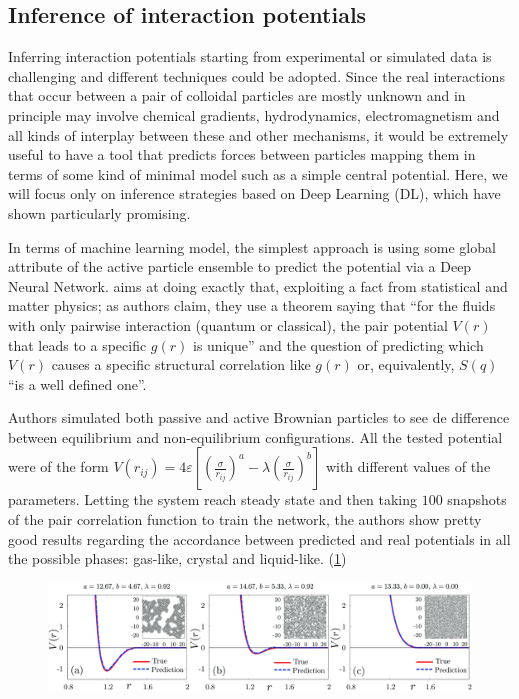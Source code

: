 \documentclass[../../master_thesis_np.tex]{subfiles}
\begin{document}
	\subsection{Inference of interaction potentials}
	Inferring interaction potentials starting from experimental or simulated data is challenging and different techniques could be adopted. 
	Since the real interactions that occur between a pair of colloidal particles are mostly unknown and in principle may involve chemical gradients, hydrodynamics, electromagnetism and all kinds of interplay between these and other mechanisms, it would be extremely useful to have a tool that predicts forces between particles mapping them in terms of some kind of minimal model such as a simple central potential. 
	Here, we will focus only on inference strategies based on Deep Learning (DL), which have shown particularly promising. 
	
	In terms of machine learning model, the simplest approach is using some global attribute of the active particle ensemble to predict the potential via a Deep Neural Network. 
	\cite{bag_interaction_2021} aims at doing exactly that, exploiting a fact from statistical and matter physics; as authors claim, they use a theorem saying that \enquote{for the fluids with only pairwise interaction (quantum or classical), the pair potential $V(r)$ that leads to a specific $g(r)$ is unique} and the question of predicting which $V(r)$ causes a specific structural correlation like $g(r)$ or, equivalently, $S(q)$ \enquote{is a well defined one}. 
	
	Authors simulated both passive and active Brownian particles to see de difference between equilibrium and non-equilibrium configurations. 
	All the tested potential were of the form $V(r_{ij}) = 4\varepsilon \left[ \left( \frac{\sigma}{r_{ij}} \right)^a - \lambda \left( \frac{\sigma}{r_{ij}} \right)^b \right]$ with different values of the parameters. 
	Letting the system reach steady state and then taking $100$ snapshots of the pair correlation function to train the network, the authors show pretty good results regarding the accordance between predicted and real potentials in all the possible phases: gas-like, crystal and liquid-like. (\ref{fig:bag1})
	\begin{figure}[htp]
		\centering
		\includegraphics[width=\singfigwidth]{bag1.png}
		\caption{\cite{bag_interaction_2021}}
		\label{fig:bag1}
	\end{figure}
	
\end{document}
